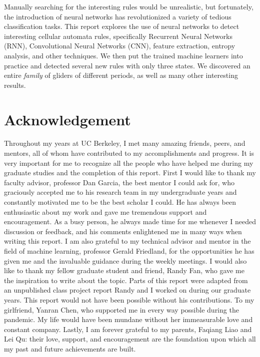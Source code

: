 \documentclass[12pt]{article}
\numberwithin{figure}{section} %
\begin{document}
Manually searching for the interesting rules would be unrealistic, but fortunately, the introduction of neural networks has revolutionized a variety of tedious classification tasks. This report explores the use of neural networks to detect interesting cellular automata rules, specifically Recurrent Neural Networks (RNN), Convolutional Neural Networks (CNN), feature extraction, entropy analysis, and other techniques. We then put the trained machine learners into practice and detected several new rules with only three states. We discovered an entire \textit{family} of gliders of different periods, as well as many other interesting results. 

\newpage
\thispagestyle{plain}
\section*{\centering Acknowledgement}

Throughout my years at UC Berkeley, I met many amazing friends, peers, and mentors, all of whom have contributed to my accomplishments and progress. It is very important for me to recognize all the people who have helped me during my graduate studies and the completion of this report. First I would like to thank my faculty advisor, professor Dan Garcia, the best mentor I could ask for, who graciously accepted me to his research team in my undergraduate years and constantly motivated me to be the best scholar I could. He has always been enthusiastic about my work and gave me tremendous support and encouragement. As a busy person, he always made time for me whenever I needed discussion or feedback, and his comments enlightened me in many ways when writing this report. I am also grateful to my technical advisor and mentor in the field of machine learning, professor Gerald Friedland, for the opportunities he has given me and the invaluable guidance during the weekly meetings. I would also like to thank my fellow graduate student and friend, Randy Fan, who gave me the inspiration to write about the topic. Parts of this report were adapted from an unpublished class project report Randy and I worked on during our graduate years. This report would not have been possible without his contributions. To my girlfriend, Yanran Chen, who supported me in every way possible during the pandemic. My life would have been mundane without her immeasurable love and constant company. Lastly, I am forever grateful to my parents, Faqiang Liao and Lei Qu: their love, support, and encouragement are the foundation upon which all my past and future achievements are built. 
\end{document}
